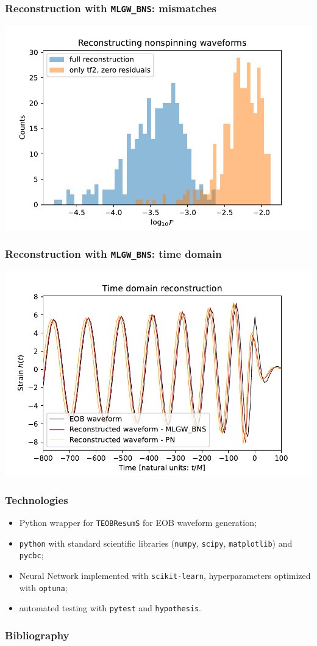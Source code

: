 \documentclass{beamer}
\begin{document}
\begin{frame}
    \frametitle{Reconstruction with \texttt{MLGW\_BNS}: mismatches}
    
    \centering
    \includegraphics[width=.95\textwidth]{figures/three_param_residuals.pdf}
\end{frame}

\begin{frame}
    \frametitle{Reconstruction with \texttt{MLGW\_BNS}: time domain}
    
    \centering
    \includegraphics[width=.95\textwidth]{figures/td_comparison.pdf}
\end{frame}

\begin{frame}
    \frametitle{Technologies}
    
    \begin{itemize}
	\item Python wrapper for \texttt{TEOBResumS} for EOB waveform generation;
	\item \texttt{python} with standard scientific libraries (\texttt{numpy}, \texttt{scipy}, \texttt{matplotlib}) and \texttt{pycbc};
	\item Neural Network implemented with \texttt{scikit-learn}, hyperparameters optimized with \texttt{optuna};
	\item automated testing with \texttt{pytest} and \texttt{hypothesis}.
    \end{itemize}
\end{frame}

\begin{frame}
    \frametitle{Bibliography}
    
    \printbibliography
\end{frame}
\end{document}
